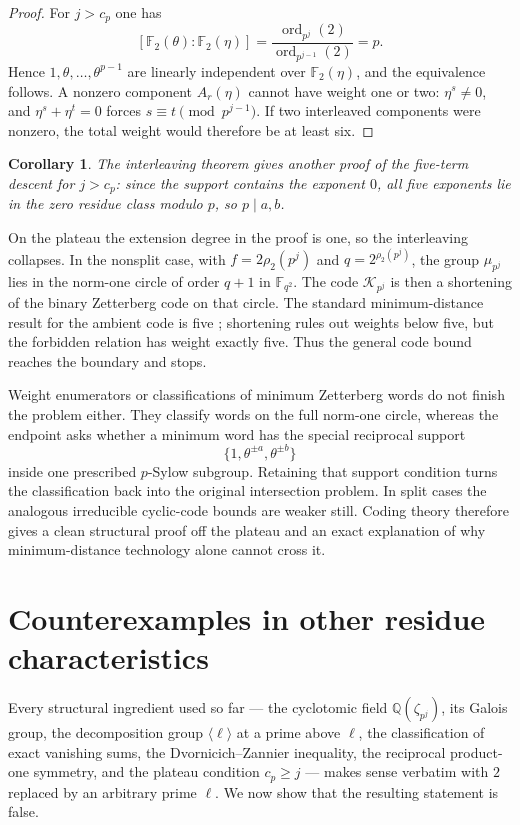 \documentclass[a4paper]{article}
\newtheorem{corollary}[theorem]{Corollary}
\newcommand{\F}{\mathbb{F}}
\newcommand{\Q}{\mathbb{Q}}
\newcommand{\ord}[2][]{\operatorname{ord}_{#1}\!\left(#2\right)}
\begin{document}
\begin{proof}
	For $j>c_p$ one has
	\[
		[\F_2(\theta):\F_2(\eta)]
		=\frac{\ord[p^j]{2}}{\ord[p^{j-1}]{2}}=p.
	\]
	Hence $1,\theta,\ldots,\theta^{p-1}$ are linearly independent over
	$\F_2(\eta)$, and the equivalence follows.
	A nonzero component $A_r(\eta)$ cannot have weight one or two:
	$\eta^s\neq0$, and
	$\eta^s+\eta^t=0$ forces $s\equiv t\pmod{p^{j-1}}$.
	If two interleaved components were nonzero, the total weight would
	therefore be at least six.
\end{proof}

\begin{corollary}
	The interleaving theorem gives another proof of the five-term descent
	for $j>c_p$: since the support contains the exponent $0$, all five
	exponents lie in the zero residue class modulo $p$, so $p\mid a,b$.
\end{corollary}

On the plateau the extension degree in the proof is one, so the
interleaving collapses.  In the nonsplit case, with
$f=2\rho_2(p^j)$ and $q=2^{\rho_2(p^j)}$, the group $\mu_{p^j}$ lies in
the norm-one circle of order $q+1$ in $\F_{q^2}$.  The code
$\mathcal K_{p^j}$ is then a shortening of the binary Zetterberg code on
that circle.  The standard minimum-distance result for the ambient code
is five \cite{LachaudWolfmann1990}; shortening rules out weights below
five, but the forbidden relation has weight exactly five.  Thus the
general code bound reaches the boundary and stops.

Weight enumerators or classifications of minimum Zetterberg words do not
finish the problem either.  They classify words on the full norm-one
circle, whereas the endpoint asks whether a minimum word has the special
reciprocal support
\[
	\{1,\theta^{\pm a},\theta^{\pm b}\}
\]
inside one prescribed $p$-Sylow subgroup.  Retaining that support condition
turns the classification back into the original intersection problem.
In split cases the analogous irreducible cyclic-code bounds are weaker
still.  Coding theory therefore gives a clean structural proof off the
plateau and an exact explanation of why minimum-distance technology alone
cannot cross it.

\section{Counterexamples in other residue characteristics}\label{sec:counterexamples}

Every structural ingredient used so far --- the cyclotomic field
$\Q(\zeta_{p^j})$, its Galois group, the decomposition group
$\langle\ell\rangle$ at a prime above $\ell$, the classification of exact
vanishing sums, the Dvornicich--Zannier inequality, the reciprocal
product-one symmetry, and the plateau condition $c_p\geq j$ --- makes sense
verbatim with $2$ replaced by an arbitrary prime $\ell$.
We now show that the resulting statement is false.
\end{document}
